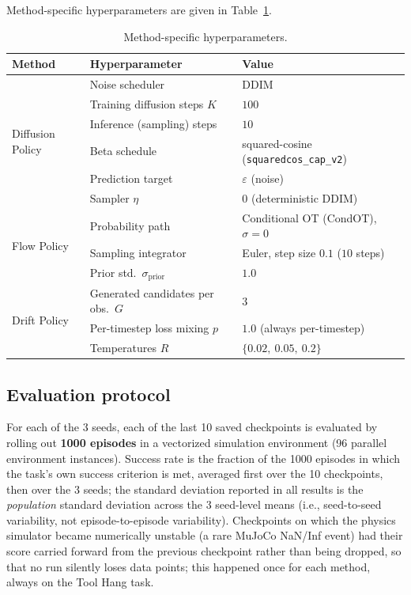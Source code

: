\documentclass[11pt]{article}
\begin{document}
Method-specific hyperparameters are given in Table~\ref{tab:hparams}.

\begin{table}[H]
\centering
\caption{Method-specific hyperparameters.}
\label{tab:hparams}
\begin{tabular}{lll}
\toprule
Method & Hyperparameter & Value \\
\midrule
\multirow{6}{*}{Diffusion Policy}
 & Noise scheduler & DDIM \\
 & Training diffusion steps $K$ & $100$ \\
 & Inference (sampling) steps & $10$ \\
 & Beta schedule & squared-cosine (\texttt{squaredcos\_cap\_v2}) \\
 & Prediction target & $\varepsilon$ (noise) \\
 & Sampler $\eta$ & $0$ (deterministic DDIM) \\
\midrule
\multirow{3}{*}{Flow Policy}
 & Probability path & Conditional OT (CondOT), $\sigma=0$ \\
 & Sampling integrator & Euler, step size $0.1$ ($10$ steps) \\
 & Prior std.\ $\sigma_{\text{prior}}$ & $1.0$ \\
\midrule
\multirow{3}{*}{Drift Policy}
 & Generated candidates per obs.\ $G$ & $3$ \\
 & Per-timestep loss mixing $p$ & $1.0$ (always per-timestep) \\
 & Temperatures $R$ & $\{0.02,\ 0.05,\ 0.2\}$ \\
\bottomrule
\end{tabular}
\end{table}

\subsection{Evaluation protocol}

For each of the 3 seeds, each of the last 10 saved checkpoints is evaluated
by rolling out \textbf{1000 episodes} in a vectorized simulation environment
(96 parallel environment instances). Success rate is the fraction of the
1000 episodes in which the task's own success criterion is met, averaged
first over the 10 checkpoints, then over the 3 seeds; the standard
deviation reported in all results is the \emph{population} standard
deviation across the 3 seed-level means (i.e., seed-to-seed variability, not
episode-to-episode variability). Checkpoints on which the physics simulator
became numerically unstable (a rare MuJoCo NaN/Inf event) had their score
carried forward from the previous checkpoint rather than being dropped, so
that no run silently loses data points; this happened once for each method,
always on the Tool Hang task.
\end{document}
